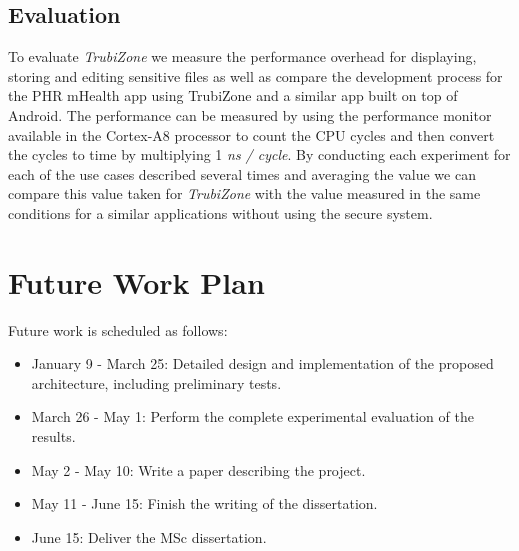 \subsection{Evaluation}


To evaluate \emph{TrubiZone} we measure the performance overhead for displaying, storing and editing sensitive files as well as compare the development process for the PHR mHealth app using TrubiZone and a similar app built on top of Android. The performance can be measured by using the performance monitor available in the Cortex-A8 processor to count the CPU cycles and then convert the cycles to time by multiplying 1 \emph{ns / cycle}. By conducting each experiment for each of the use cases described several times and averaging the value we can compare this value taken for \emph{TrubiZone} with the value measured in the same conditions for a similar applications without using the secure system.



\section{Future Work Plan}
\label{sec:workplan}

Future work is scheduled as follows:

\begin{itemize}
	\item January 9 - March 25: Detailed design and implementation of the
	proposed architecture, including preliminary tests.
	\item March 26 - May 1: Perform the complete experimental evaluation
	of the results.
	\item May 2 - May 10: Write a paper describing the project.
	\item May 11 - June 15: Finish the writing of the dissertation.
	\item June 15: Deliver the MSc dissertation.
\end{itemize}

